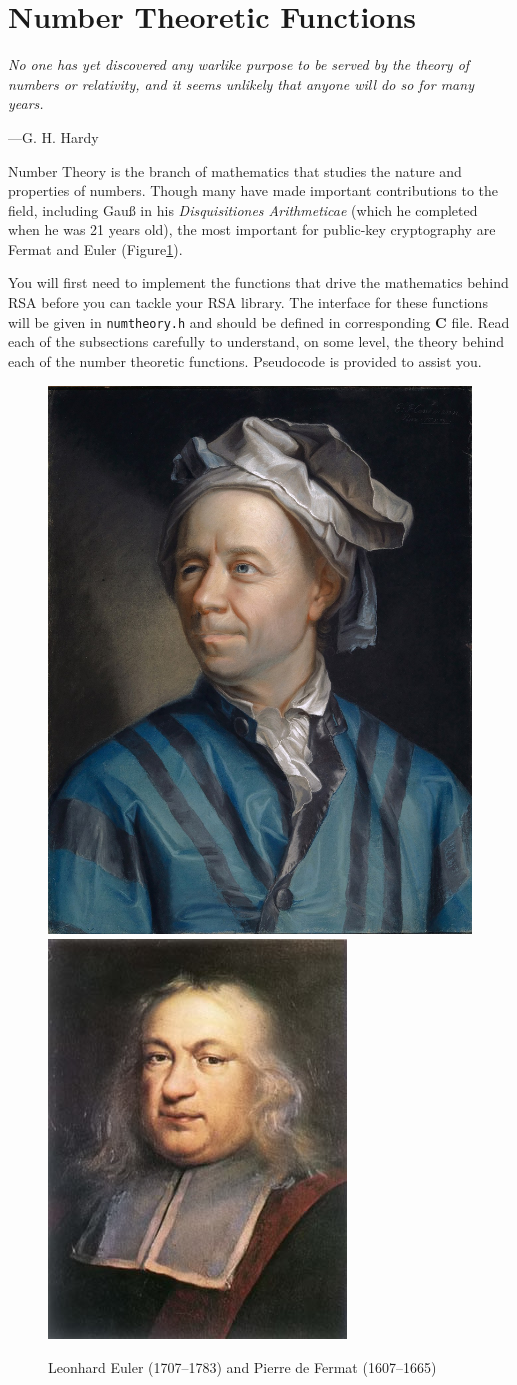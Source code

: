 \section{Number Theoretic Functions}
\epigraph{\emph{No one has yet discovered any warlike purpose to be served by the theory of numbers or relativity, and it seems unlikely that anyone will do so for many years.}}
{---G.\xspace H.\xspace Hardy}

\noindent
Number Theory is the branch of mathematics that studies the nature
and properties of numbers. Though many have made important contributions
to the field, including Gau{\ss} in his \emph{Disquisitiones
Arithmeticae} (which he completed when he was 21 years old), the
most important for public-key cryptography are Fermat and Euler
(Figure\xspace\ref{fig:euler}).

You will first need to implement the functions that drive the
mathematics behind RSA before you can tackle your RSA library. The
interface for these functions will be given in \texttt{numtheory.h} and
should be defined in corresponding \textbf{C} file. Read each of the subsections
carefully to understand, on some level, the theory behind each of the
number theoretic functions. Pseudocode is provided to assist you.

\begin{figure}[tbhp]
        \centering
        \includegraphics[height=0.33\textwidth]{./images/euler.jpg}\quad
        \includegraphics[height=0.33\textwidth]{./images/fermat.jpg}
        \caption{Leonhard Euler (1707--1783) and Pierre de Fermat (1607--1665)}\label{fig:euler}
\end{figure}
